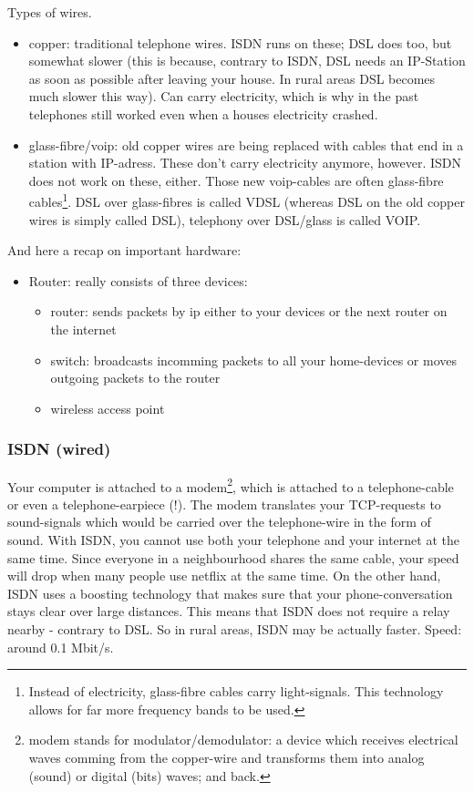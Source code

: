 Types of wires.
\begin{itemize}
    \item copper: traditional telephone wires. ISDN runs on these; DSL does too, but somewhat slower (this is because, contrary to ISDN, DSL needs an IP-Station as soon as possible after leaving your house. In rural areas DSL becomes much slower this way). Can carry electricity, which is why in the past telephones still worked even when a houses electricity crashed. 
    \item glass-fibre/voip: old copper wires are being replaced with cables that end in a station with IP-adress. These don't carry electricity anymore, however. ISDN does not work on these, either. Those new voip-cables are often glass-fibre cables\footnote{Instead of electricity, glass-fibre cables carry light-signals. This technology allows for far more frequency bands to be used.}. DSL over glass-fibres is called VDSL (whereas DSL on the old copper wires is simply called DSL), telephony over DSL/glass is called VOIP.
\end{itemize}

And here a recap on important hardware: 
\begin{itemize}
    \item Router: really consists of three devices: 
        \begin{itemize} 
            \item router: sends packets by ip either to your devices or the next router on the internet
            \item switch: broadcasts incomming packets to all your home-devices or moves outgoing packets to the router
            \item wireless access point
        \end{itemize}
\end{itemize}

\subsubsection{ISDN (wired)}
Your computer is attached to a modem\footnote{modem stands for modulator/demodulator: a device which receives electrical waves comming from the copper-wire and transforms them into analog (sound) or digital (bits) waves; and back.}, which is attached to a telephone-cable or even a telephone-earpiece (!). The modem translates your TCP-requests to sound-signals which would be carried over the telephone-wire in the form of sound. With ISDN, you cannot use both your telephone and your internet at the same time.  
Since everyone in a neighbourhood shares the same cable, your speed will drop when many people use netflix at the same time. 
On the other hand, ISDN uses a boosting technology that makes sure that your phone-conversation stays clear over large distances. This means that ISDN does not require a relay nearby - contrary to DSL. So in rural areas, ISDN may be actually faster. 
Speed: around 0.1 Mbit/s.



